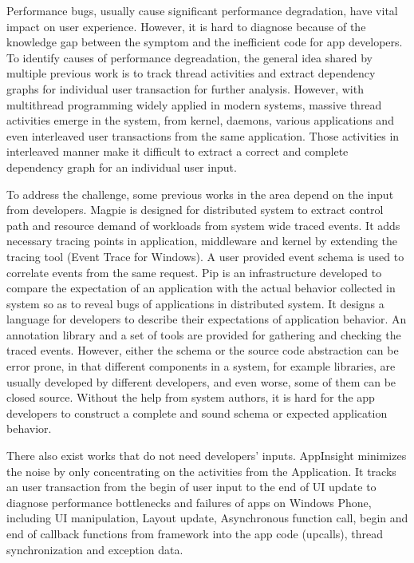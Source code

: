 Performance bugs, usually cause significant performance degradation, have vital impact on user experience.
However, it is hard to diagnose because of the knowledge gap between the symptom and the inefficient code for app developers.
To identify causes of performance degreadation, the general idea shared by multiple previous work is to track thread  activities and extract dependency graphs for individual user transaction for further analysis.
However, with multithread programming widely applied in modern systems, massive thread activities emerge in the system, from kernel, daemons, various applications and even interleaved user transactions from the same application.
Those activities in interleaved manner make it difficult to extract a correct and complete dependency graph for an individual user input.
\par
To address the challenge, some previous works in the area depend on the input from developers.
Magpie is designed for distributed system to extract control path and resource demand of workloads from system wide traced events.
It adds necessary tracing points in application, middleware and kernel by extending the tracing tool (Event Trace for Windows).
A user provided event schema is used to correlate events from the same request.
Pip is an infrastructure developed to compare the expectation of an application with the actual behavior collected in system so as to reveal bugs of applications in distributed system.
It designs a language for developers to describe their expectations of application behavior.
An annotation library and a set of tools are provided for gathering and checking the traced events.
However, either the schema or the source code abstraction can be error prone, in that different components in a system, for example libraries, are usually developed by different developers, and even worse, some of them can be closed source.
Without the help from system authors, it is hard for the app developers to construct a complete and sound schema or expected application behavior.
\par
There also exist works that do not need developers' inputs.
AppInsight minimizes the noise by only concentrating on the activities from the Application.
It tracks an user transaction from the begin of user input to the end of UI update to diagnose performance bottlenecks and failures of apps on Windows Phone, including UI manipulation, Layout update, Asynchronous function call, begin and end of callback functions from framework into the app code (upcalls), thread synchronization and exception data.
